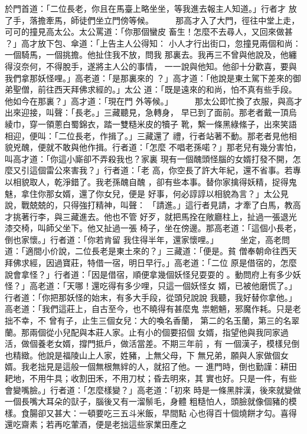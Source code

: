 \begin{pinyinscope}
{於門首道：「二位長老，你且在馬臺上略坐坐，等我進去報主人知道。」行者才
放了手，落擔牽馬，師徒們坐立門傍等候。
　　
那高才入了大門，徑往中堂上走，可可的撞見高太公。太公罵道：「你那個蠻皮
畜生！怎麼不去尋人，又回來做甚 ？」高才放下包、傘道：「上告主人公得知：
小人才行出街口，忽撞見兩個和尚：一個騎馬，一個挑擔。他扯住我不放，問我
那裏去。我再三不曾與他說及，他纏得沒奈何，不得脫手，遂將主人公的事情，
一一說與他知。他卻十分歡喜，要與我們拿那妖怪哩。」高老道：「是那裏來的
？」高才道：「他說是東土駕下差來的御弟聖僧，前往西天拜佛求經的。」太公
道：「既是遠來的和尚，怕不真有些手段。他如今在那裏？」高才道：「現在門
外等候。」
　　
那太公即忙換了衣服，與高才出來迎接，叫聲：「長老。」三藏聽見，急轉身，
早已到了面前。那老者戴一頂烏綾巾，穿一領蔥白蜀錦衣，踏一雙糙米皮的犢子
靴，繫一條黑綠絛子，出來笑語相迎，便叫：「二位長老，作揖了。」三藏還了
禮，行者站著不動。那老者見他相貌兇醜，便就不敢與他作揖。行者道：「怎麼
不唱老孫喏？」那老兒有幾分害怕，叫高才道：「你這小廝卻不弄殺我也？家裏
現有一個醜頭怪腦的女婿打發不開，怎麼又引這個雷公來害我？」行者道：「老
高，你空長了許大年紀，還不省事。若專以相貌取人，乾淨錯了。我老孫醜自醜
，卻有些本事。替你家擒得妖精，捉得鬼魅，拿住你那女婿，還了你女兒，便是
好事，何必諄諄以相貌為言？」太公見說，戰兢兢的，只得強打精神，叫聲：
「請進。」這行者見請，才牽了白馬，教高才挑著行李，與三藏進去。他也不管
好歹，就把馬拴在敞廳柱上，扯過一張退光漆交椅，叫師父坐下。他又扯過一張
椅子，坐在傍邊。那高老道：「這個小長老，倒也家懷。」行者道：「你若肯留
我住得半年，還家懷哩。」
　　
坐定，高老問道：「適間小价說，二位長老是東土來的？」三藏道：「便是。貧
僧奉朝命往西天拜佛求經，因過寶莊，特借一宿，明日早行。」高老道：「二位
原是借宿的，怎麼說會拿怪？」行者道：「因是借宿，順便拿幾個妖怪兒耍耍的
。動問府上有多少妖怪？」高老道：「天哪！還吃得有多少哩，只這一個妖怪女
婿，已被他磨慌了。」行者道：「你把那妖怪的始末，有多大手段，從頭兒說說
我聽，我好替你拿他。」高老道：「我們這莊上，自古至今，也不曉得有甚麼鬼
祟魍魎，邪魔作耗。只是老拙不幸，不 曾有子，止生三個女兒：大的喚名香蘭，
第二的名玉蘭，第三的名翠蘭。那兩個從小兒配與本莊人家。止有小的個要招個
女婿，指望他與我同家過活，做個養老女婿，撐門抵戶，做活當差。不期三年前
，有 一個漢子，模樣兒倒也精緻。他說是福陵山上人家，姓豬，上無父母，下
無兄弟，願與人家做個女婿。我老拙見是這般一個無根無絆的人，就招了他。一
進門時，倒也勤謹：耕田耙地，不用牛具；收割田禾，不用刀杖；昏去明來，其
實也好。只是一件，有些會變嘴臉。」行者道：「怎麼樣變？」高老道：「初來
時是一條黑胖漢，後來就變做一個長嘴大耳朵的獃子，腦後又有一溜鬃毛，身體
粗糙怕人，頭臉就像個豬的模樣。食腸卻又甚大：一頓要吃三五斗米飯，早間點
心也得百十個燒餅才勾。喜得還吃齋素；若再吃葷酒，便是老拙這些家業田產之
}
\end{pinyinscope}
